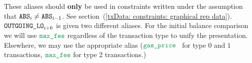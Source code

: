 \noindent These aliases should \textbf{only} be used in constraints written under the assumption that $\texttt{ABS}_{i} \neq \texttt{ABS}_{i - 1}$. See section~(\ref{txData: constraints: graphical rep data}).
\saNote{}
$\texttt{OUTGOING}\texttt{\_LO}_{i + 6}$ is given two different aliases. For the initial balance comparison we will use $\locMaxFee$ regardless of the transaction type to unify the presentation. Elsewhere, we may use the appropriate alias ($\locGasPrice$ for type $0$ and $1$ transactions, $\locMaxFee$ for type 2 transactions.)
